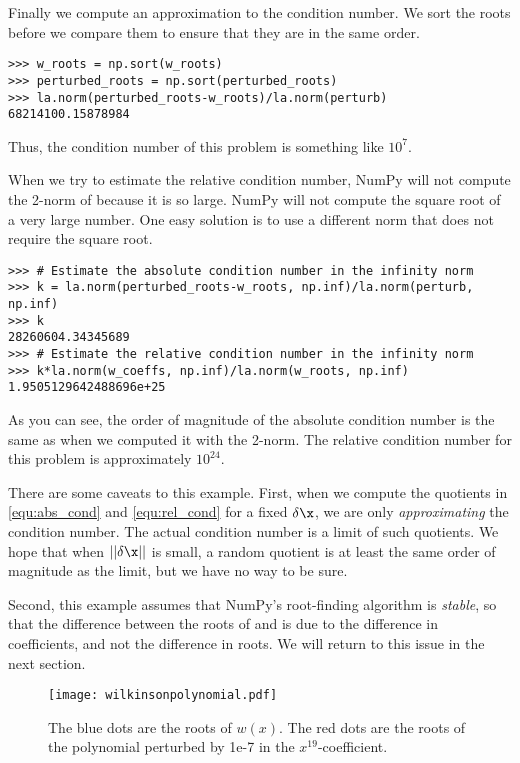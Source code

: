 Finally we compute an approximation to the condition number.
We sort the roots before we compare them to ensure that they are in the same order.
\begin{lstlisting}
>>> w_roots = np.sort(w_roots)
>>> perturbed_roots = np.sort(perturbed_roots)
>>> la.norm(perturbed_roots-w_roots)/la.norm(perturb)
68214100.15878984
\end{lstlisting}
Thus, the condition number of this problem is something like $10^7$.

When we try to estimate the relative condition number, NumPy will not compute the 2-norm of  because it is so large.
NumPy will not compute the square root of a very large number.
One easy solution is to use a different norm that does not require the square root.
\begin{lstlisting}
>>> # Estimate the absolute condition number in the infinity norm
>>> k = la.norm(perturbed_roots-w_roots, np.inf)/la.norm(perturb, np.inf)
>>> k
28260604.34345689
>>> # Estimate the relative condition number in the infinity norm
>>> k*la.norm(w_coeffs, np.inf)/la.norm(w_roots, np.inf)
1.9505129642488696e+25
\end{lstlisting}
As you can see, the order of magnitude of the absolute condition number is the same as when we computed it with the 2-norm.
The relative condition number for this problem is approximately $10^{24}$.


There are some caveats to this example.
First, when we compute the quotients in \eqref{equ:abs_cond} and \eqref{equ:rel_cond} for a fixed $\delta \x$, we are only \emph{approximating} the condition number.
The actual condition number is a limit of such quotients.
We hope that when $||\delta \x||$ is small, a random quotient is at least the same order of magnitude as the limit, but we have no way to be sure.

Second, this example assumes that NumPy's root-finding algorithm is \emph{stable}, so that the difference between the roots of  and  is due to the difference in coefficients, and not the difference in roots.
We will return to this issue in the next section.


\begin{figure}
\centering
\texttt{[image: wilkinsonpolynomial.pdf]}
\caption{The blue dots are the roots of $w(x)$. The red dots are the roots of the polynomial perturbed by 1e-7 in the $x^{19}$-coefficient. }
\label{fig:wilkinsonpolynomial}
\end{figure}


